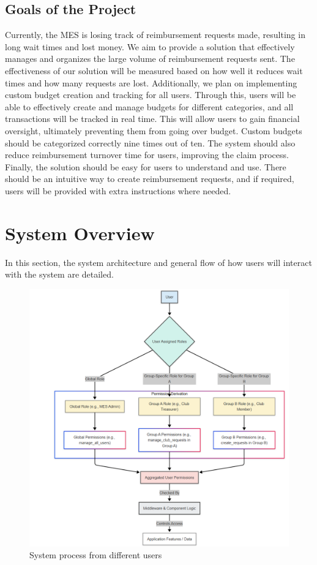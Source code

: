 \documentclass[12pt]{article}
\begin{document}
\subsection{Goals of the Project}
Currently, the MES is losing track of reimbursement requests made, resulting in long wait times and lost money. We aim to provide a solution that effectively manages and organizes the large volume of reimbursement requests sent. The effectiveness of our solution will be measured based on how well it reduces wait times and how many requests are lost. Additionally, we plan on implementing custom budget creation and tracking for all users. Through this, users will be able to effectively create and manage budgets for different categories, and all transactions will be tracked in real time. This will allow users to gain financial oversight, ultimately preventing them from going over budget. Custom budgets should be categorized correctly nine times out of ten. The system should also reduce reimbursement turnover time for users, improving the claim process. Finally, the solution should be easy for users to understand and use. There should be an intuitive way to create reimbursement requests, and if required, users will be provided with extra instructions where needed.

\section{System Overview} 
In this section, the system architecture and general flow of how users will interact with the system are detailed.  

\begin{figure}[h!]
  \centering
  \includegraphics[width=1\textwidth]{system_detail.png}
  \caption{System process from different users}
  \label{fig:detailed-architecture}
\end{figure}
\end{document}
